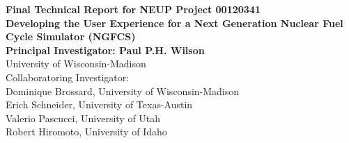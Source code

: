 
\begin{titlepage}
  \begin{center}
    {\Large\bfseries Final Technical Report for NEUP Project 00120341}\\[1cm]
    {\huge\bfseries Developing the User Experience for a Next Generation Nuclear Fuel Cycle Simulator (NGFCS)}\\

    \vspace{2cm}
    {\bfseries Principal Investigator: Paul P.H. Wilson}\\[5pt]
    University of Wisconsin-Madison\\

    \vspace{2cm}
    Collaboratoring Investigator:\\[5pt]
    Dominique Brossard, University of Wisconsin-Madison\\
    Erich Schneider, University of Texas-Austin\\
    Valerio Pascucci, University of Utah\\
    Robert Hiromoto, University of Idaho\\

    \vfill



    
  \end{center}
\end{titlepage}
